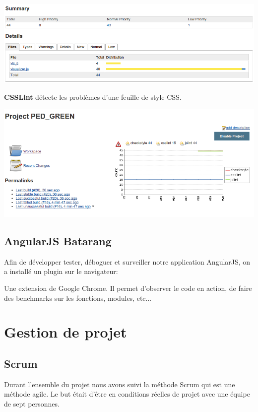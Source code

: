 \documentclass [a4paper,11pt]{article}
\begin{document}
\begin{center}
\includegraphics[scale=0.4]{img/checkstyle.png}
\end{center}

\textbf{CSSLint} détecte les problèmes d'une feuille de style CSS.

\begin{center}
\includegraphics[scale=0.4]{img/jslint.png}
\end{center}

\subsection{AngularJS Batarang}

Afin de développer tester, déboguer et surveiller notre application AngularJS, on a installé un plugin sur le navigateur:\newline

Une extension de Google Chrome. Il permet d'observer le code en action, de faire des benchmarks sur les fonctions, modules, etc...

\newpage
\section{Gestion de projet}

\subsection{Scrum}

Durant l'ensemble du projet nous avons suivi la méthode Scrum qui est une méthode agile. Le but était d'être en conditions réelles de projet avec une équipe de sept personnes. 
\newline
\end{document}
